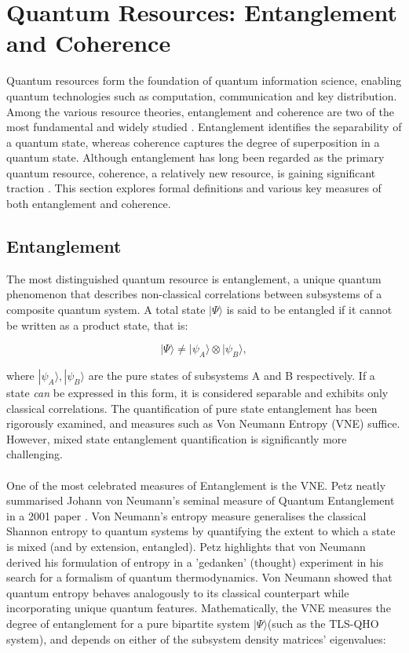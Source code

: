 \documentclass[12pt,a4paper]{article}
\begin{document}
\section{Quantum Resources: Entanglement and Coherence} \label{sec_QRes}

Quantum resources form the foundation of quantum information science, enabling quantum technologies such as computation, communication and key distribution. Among the various resource theories, entanglement and coherence are two of the most fundamental and widely studied \cite{CohEnt2019-QRT_def}. Entanglement identifies the separability of a quantum state, whereas coherence captures the degree of superposition in a quantum state. Although entanglement has long been regarded as the primary quantum resource, coherence, a relatively new resource, is gaining significant traction \cite{CohEnt2019-QRT_def}. This section explores formal definitions and various key measures of both entanglement and coherence. 

\subsection{Entanglement} \label{subsec_ent}

The most distinguished quantum resource is entanglement, a unique quantum phenomenon that describes non-classical correlations between subsystems of a composite quantum system. A total state $|\Psi\rangle$ is said to be entangled if it cannot be written as a product state, that is:

\begin{equation}
    |\Psi\rangle \neq |\psi_A\rangle \otimes |\psi_B\rangle,
\end{equation}

where $|\psi_A\rangle, |\psi_B\rangle$ are the pure states of subsystems A and B respectively. If a state \textit{can} be expressed in this form, it is considered separable and exhibits only classical correlations. The quantification of pure state entanglement has been rigorously examined, and measures such as Von Neumann Entropy (VNE) suffice. However, mixed state entanglement quantification is significantly more challenging. \\
\\
One of the most celebrated measures of Entanglement is the VNE. Petz neatly summarised Johann von Neumann's seminal measure of Quantum Entanglement in a 2001 paper \cite{Entanglement2001-VNE_Definition}. Von Neumann's entropy measure generalises the classical Shannon entropy to quantum systems by quantifying the extent to which a state is mixed (and by extension, entangled). Petz highlights that von Neumann derived his formulation of entropy in a 'gedanken' (thought) experiment in his search for a formalism of quantum thermodynamics. Von Neumann showed that quantum entropy behaves analogously to its classical counterpart while incorporating unique quantum features. Mathematically, the VNE \cite{Entanglement2001-VNE_Definition} measures the degree of entanglement for a pure bipartite system $|\Psi\rangle$(such as the TLS-QHO system), and depends on either of the subsystem density matrices' eigenvalues:
\end{document}
